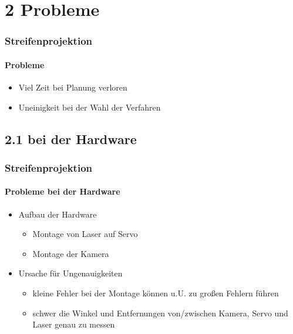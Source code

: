 \documentclass{beamer}
\begin{document}
\section{2 \hspace{5px} Probleme}
\begin{frame}
	\frametitle{Streifenprojektion}
	\framesubtitle{Probleme}

	\begin{itemize}
		\item Viel Zeit bei Planung verloren
		\item Uneinigkeit bei der Wahl der Verfahren
	\end{itemize}

\end{frame}

\subsection{2.1 \hspace{5px} bei der Hardware}
\begin{frame}
	\frametitle{Streifenprojektion}
	\framesubtitle{Probleme bei der Hardware}

	\begin{itemize}
		\item Aufbau der Hardware
		\begin{itemize}
			\item Montage von Laser auf Servo
			\item Montage der Kamera
		\end{itemize}
		\item Ursache für Ungenauigkeiten
		\begin{itemize}
			\item kleine Fehler bei der Montage können u.U. zu großen Fehlern führen
			\item schwer die Winkel und Entfernungen von/zwischen Kamera, Servo und Laser genau zu messen 
		\end{itemize}
	\end{itemize}

\end{frame}
\end{document}
